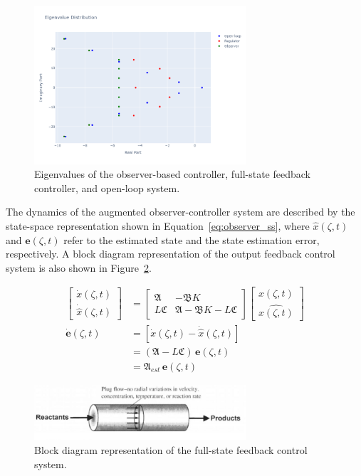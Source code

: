 \begin{figure}[H]
    \centering
    \includegraphics*[width=0.7\textwidth]{Figures/pole_placement.png}
    \caption{Eigenvalues of the observer-based controller, full-state feedback controller, and open-loop system.}
    \label{fig:eigs}
\end{figure}

The dynamics of the augmented observer-controller system are described by the state-space representation shown in Equation~\ref{eq:observer_ss}, where $\hat{x}(\zeta, t)$ and $\mathbf{e}(\zeta, t)$ refer to the estimated state and the state estimation error, respectively. A block diagram representation of the output feedback control system is also shown in Figure~\ref{fig:block_diagram_observer}.

\begin{equation}
    \begin{aligned} \label{eq:observer_ss}
        \left[\begin{array}{c}
            \dot{x}(\zeta,t) \\ \hline \dot{\hat{x}}(\zeta,t)
        \end{array}\right] &= 
        \left[
            \begin{array}{c|c}
                \mathfrak{A} & -\mathfrak{B} K \\ \hline
                L \mathfrak{C} & \mathfrak{A} - \mathfrak{B} K - L \mathfrak{C}
            \end{array}
        \right]
        \left[ \begin{array}{c}
            x(\zeta,t) \\ \hline \hat{x(\zeta,t)} \end{array}
            \right] \\
        \dot{\mathbf{e}}(\zeta,t) &= \left[ \dot{x}(\zeta,t) - \dot{\hat{x}}(\zeta,t) \right] \\
        &= (\mathfrak{A} - L \mathfrak{C}) \, \mathbf{e}(\zeta,t) \\
        &= \mathfrak{A}_{est} \, \mathbf{e}(\zeta,t)
    \end{aligned}
\end{equation}

\begin{figure}[H]
    \centering
    \includegraphics*[width=0.7\textwidth]{Figures/sample.jpeg}
    \caption{Block diagram representation of the full-state feedback control system.}
    \label{fig:block_diagram_observer}
\end{figure}